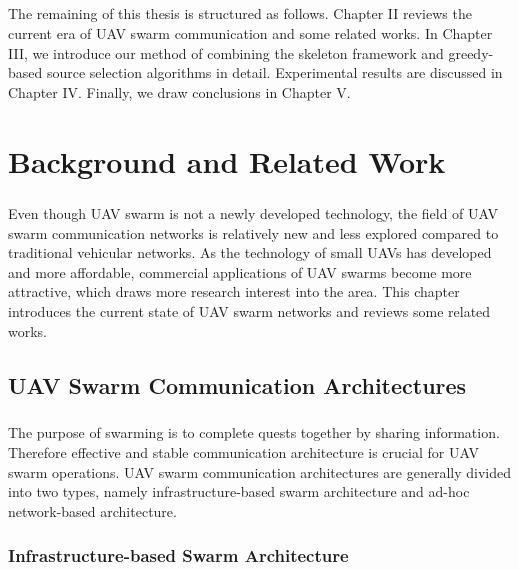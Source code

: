 \documentclass[a4paper,12pt]{report}
\begin{document}
\paragraph{}
The remaining of this thesis is structured as follows. Chapter II reviews the current era of UAV swarm communication and some related works. In Chapter III, we introduce our method of combining the skeleton framework and greedy-based source selection algorithms in detail. Experimental results are discussed in Chapter IV. Finally, we draw conclusions in Chapter V.

\chapter{Background and Related Work}
\paragraph{}
Even though UAV swarm is not a newly developed technology, the field of UAV swarm communication networks is relatively new and less explored compared to traditional vehicular networks. As the technology of small UAVs has developed and more affordable, commercial applications of UAV swarms become more attractive, which draws more research interest into the area. This chapter introduces the current state of UAV swarm networks and reviews some related works.

\section{UAV Swarm Communication Architectures}

\paragraph{}
The purpose of swarming is to complete quests together by sharing information. Therefore effective and stable communication architecture is crucial for UAV swarm operations. UAV swarm communication architectures are generally divided into two types, namely infrastructure-based swarm architecture and ad-hoc network-based architecture\cite{doi:10.1139/juvs-2018-0009, bekmezci2013flying, chen2020toward}.

\subsection{Infrastructure-based Swarm Architecture}
\end{document}
